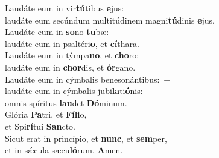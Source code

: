 \evenverse Laudáte eum in vir\textbf{tú}tibus \textbf{e}jus:~\*\\
\evenverse laudáte eum secúndum multitúdinem magni\textbf{tú}dinis \textbf{e}jus.\\
\oddverse Laudáte eum in \textbf{so}no \textbf{tu}bæ:~\*\\
\oddverse laudáte eum in psaltéri\textbf{o}, et \textbf{cí}thara.\\
\evenverse Laudáte eum in týmpa\textbf{no}, et \textbf{cho}ro:~\*\\
\evenverse laudáte eum in \textbf{chor}dis, et \textbf{ór}gano.\\
\oddverse Laudáte eum in cýmbalis benesonántibus:~+\\
\oddverse  laudáte eum in cýmbalis jubi\textbf{la}ti\textbf{ó}nis:~\*\\
\oddverse omnis spíritus \textbf{lau}det \textbf{Dó}minum.\\
\evenverse Glória \textbf{Pa}tri, et \textbf{Fí}\textbf{li}o,~\*\\
\evenverse et Spi\textbf{rí}tui \textbf{San}cto.\\
\oddverse Sicut erat in princípio, et \textbf{nunc}, et \textbf{sem}per,~\*\\
\oddverse et in sǽcula sæcu\textbf{ló}rum. \textbf{A}men.\\
